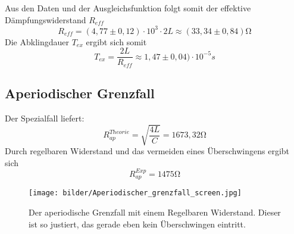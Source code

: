 Aus den Daten und der Ausgleichsfunktion folgt somit der effektive Dämpfungswiderstand 
$R_{eff}$
\begin{equation}
    R_{eff}= (4,77 \pm 0,12)\cdot10^3 \cdot 2L \approx (33,34 \pm 0,84) \si{\ohm}
\end{equation}
Die Abklingdauer $T_{ex}$ ergibt sich somit
\begin{equation}
    T_{ex}=\frac{2L}{R_{eff}}\approx 1,47 \pm 0,04) \cdot 10^{-5}s
\end{equation}






\subsection{Aperiodischer Grenzfall}
Der Spezialfall liefert:
\begin{equation}
    R_{ap}^{Theorie}=\sqrt{\frac{4L}{C}}=1673,32\si{\ohm}     %
\end{equation}
Durch regelbaren Widerstand und das vermeiden eines Überschwingens ergibt sich
\begin{equation}
    R_{ap}^{Exp}=1475\si{\ohm}
\end{equation}
\begin{figure}
    \centering
    \texttt{[image: bilder/Aperiodischer\_grenzfall\_screen.jpg]}
    \caption{Der aperiodische Grenzfall mit einem Regelbaren Widerstand. Dieser ist so justiert, das gerade eben kein Überschwingen eintritt.}    %
\end{figure} 
\newpage







